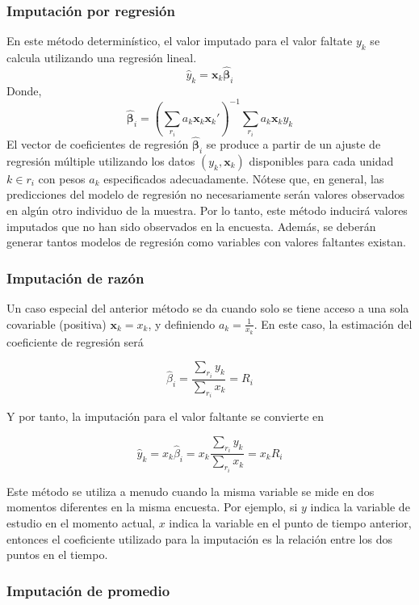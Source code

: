\hypertarget{imputacion-por-regresion}{%
\subsubsection*{Imputación por regresión}\label{imputacion-por-regresion}}


En este método determinístico, el valor imputado para el valor faltate \(y_k\) se calcula utilizando una regresión lineal.
\[\hat{y}_k = \mathbf{x}_k \hat{\boldsymbol{\beta}}_i\]
Donde,
\[
\hat{\boldsymbol{\beta}}_i = (\sum_{r_i} a_k\mathbf{x}_k\mathbf{x}_k')^{-1}
\sum_{r_i} a_k\mathbf{x}_ky_k
\]
El vector de coeficientes de regresión \(\hat{\boldsymbol{\beta}}_i\) se produce a partir de un ajuste de regresión múltiple utilizando los datos \((y_k, \mathbf{x}_k)\) disponibles para cada unidad \(k \in r_i\) con pesos \(a_k\) especificados adecuadamente. Nótese que, en general, las predicciones del modelo de regresión no necesariamente serán valores observados en algún otro individuo de la muestra. Por lo tanto, este método inducirá valores imputados que no han sido observados en la encuesta. Además, se deberán generar tantos modelos de regresión como variables con valores faltantes existan.

\hypertarget{imputacion-de-razon}{%
\subsubsection*{Imputación de razón}\label{imputacion-de-razon}}


Un caso especial del anterior método se da cuando solo se tiene acceso a una sola covariable (positiva) \(\mathbf{x}_k = x_k\), y definiendo \(a_k = \frac{1}{x_k}\). En este caso, la estimación del coeficiente de regresión será

\[
\hat{{\beta}}_i = \frac{\sum_{r_i}y_k}{\sum_{r_i}x_k} = R_i
\]

Y por tanto, la imputación para el valor faltante se convierte en

\[\hat{y}_k = x_k \hat{\beta}_i = x_k \frac{\sum_{r_i}y_k}{\sum_{r_i}x_k} = x_k R_i\]

Este método se utiliza a menudo cuando la misma variable se mide en dos momentos diferentes en la misma encuesta. Por ejemplo, si \(y\) indica la variable de estudio en el momento actual, \(x\) indica la variable en el punto de tiempo anterior, entonces el coeficiente utilizado para la imputación es la relación entre los dos puntos en el tiempo.

\hypertarget{imputacion-de-promedio}{%
\subsubsection*{Imputación de promedio}\label{imputacion-de-promedio}}



